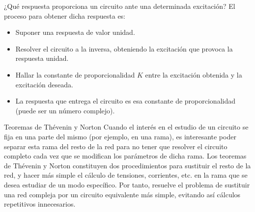 \documentclass[11pt]{book} %
\makeatletter
\numberwithin{dummy}{section}
\theoremstyle{ocrenumbox}
\theoremstyle{blacknumex}
\theoremstyle{blacknumbox}
\theoremstyle{ocrenum}
\renewcommand{\section}{\@startsection{section}{1}{\z@}
{-4ex \@plus -1ex \@minus -.4ex}
{1ex \@plus.2ex }
{\normalfont\large\sffamily\bfseries}}
\renewcommand{\subsubsection}{\@startsection {subsubsection}{3}{\z@}
{-2ex \@plus -0.1ex \@minus -.2ex}
{.2ex \@plus.2ex }
{\normalfont\small\sffamily\bfseries}}
\newlength\esp
\makeatother
\begin{document}
  \subsubsection{¿Qué respuesta proporciona un circuito ante una determinada excitación?}
  El proceso para obtener dicha respuesta es:
  \begin{itemize}
\item Suponer una respuesta de valor unidad.
\item Resolver el circuito a la inversa, obteniendo la excitación que provoca la respuesta unidad.
\item Hallar la constante de proporcionalidad $K$ entre la excitación obtenida y la excitación deseada.
\item La respuesta que entrega el circuito es esa constante de proporcionalidad (puede ser un número complejo).
\end{itemize}



\section{Teoremas de Thévenin y Norton}
Cuando el interés en el estudio de un circuito se fija en una parte del mismo (por ejemplo, en una rama), es interesante poder separar esta rama del resto de la red para no tener que resolver el circuito completo cada vez que se modifican los parámetros de dicha rama.  Los teoremas de Thévenin y Norton constituyen dos procedimientos para sustituir el resto de la red, y hacer más simple el cálculo de tensiones, corrientes, etc. en la rama que se desea estudiar de un modo específico. Por tanto, resuelve el problema de sustituir una red compleja por un circuito equivalente más simple, evitando así cálculos repetitivos innecesarios. 
\end{document}
